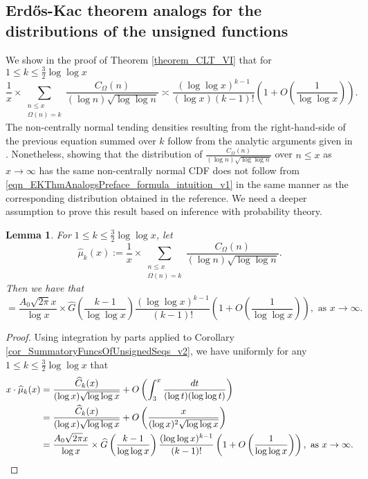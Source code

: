 \documentclass[11pt,reqno,a4letter]{article}
\numberwithin{figure}{section}
\numberwithin{table}{section}
\theoremstyle{plain}
\newtheorem{lemma}[theorem]{Lemma}
\numberwithin{theorem}{section}
\theoremstyle{definition}
\begin{document}
\subsection{Erd\H{o}s-Kac theorem analogs for the distributions of the unsigned functions} 
\label{subSection_ErdosKacTheorem_Analogs} 

We show in the proof of 
Theorem \ref{theorem_CLT_VI} that for 
$1 \leq k \leq \frac{3}{2} \log\log x$ 
\begin{equation}
\label{eqn_EKThmAnalogsPreface_formula_intuition_v1}
     \frac{1}{x} \times \sum_{\substack{n \leq x \\ \Omega(n)=k}} 
     \frac{C_{\Omega}(n)}{(\log n) \sqrt{\log\log n}} \asymp 
     \frac{(\log\log x)^{k-1}}{(\log x) (k-1)!} \left(1 + 
     O\left(\frac{1}{\log\log x}\right)\right). 
\end{equation} 
The non-centrally normal tending densities resulting from the right-hand-side of the 
previous equation summed over $k$ follow from the analytic arguments given in 
\cite[Thm.~7.21; \S 7.4]{MV}. 
Nonetheless, showing that the distribution of 
$\frac{C_{\Omega}(n)}{(\log n) \sqrt{\log\log n}}$ over $n \leq x$ as $x \rightarrow \infty$ 
has the same non-centrally normal CDF does not follow from 
\eqref{eqn_EKThmAnalogsPreface_formula_intuition_v1} in the 
same manner as the corresponding distribution obtained in the reference. 
We need a deeper assumption to prove this result based on inference with 
probability theory. 

\begin{lemma}
For $1 \leq k \leq \frac{3}{2} \log\log x$, let 
\[
\widehat{\mu}_k(x) := \frac{1}{x} \times \sum_{\substack{n \leq x \\ \Omega(n)=k}} 
          \frac{C_{\Omega}(n)}{(\log n) \sqrt{\log\log n}}. 
\] 
Then we have that 
\begin{equation} 
\label{eqn_ProofTag_AnsatzRVDiffFromMeanBound_v0} 
     = \frac{A_0 \sqrt{2\pi} x}{\log x} \times \widehat{G}\left(\frac{k-1}{\log\log x}\right) 
     \frac{(\log\log x)^{k-1}}{(k-1)!}\left(1 + O\left(\frac{1}{\log\log x}\right)\right), 
     \text{ as } x \rightarrow \infty. 
\end{equation}
\end{lemma}
\begin{proof}
Using integration by parts applied to 
Corollary \ref{cor_SummatoryFuncsOfUnsignedSeqs_v2}, we have 
uniformly for any $1 \leq k \leq \frac{3}{2} \log\log x$ that 
\begin{align} 
\notag 
x \cdot \widehat{\mu}_k(x) & = 
     \frac{\widehat{C}_k(x)}{(\log x) \sqrt{\log\log x}} + O\left( 
     \int_3^x \frac{dt}{(\log t) (\log\log t)}\right) \\ 
\notag 
     & = 
     \frac{\widehat{C}_k(x)}{(\log x) \sqrt{\log\log x}} + O\left( 
     \frac{x}{(\log x)^2 \sqrt{\log\log x}}\right) \\ 
\notag 
     & = \frac{A_0 \sqrt{2\pi} x}{\log x} \times \widehat{G}\left(\frac{k-1}{\log\log x}\right) 
     \frac{(\log\log x)^{k-1}}{(k-1)!}\left(1 + O\left(\frac{1}{\log\log x}\right)\right), 
     \text{ as } x \rightarrow \infty. 
\end{align} 
\end{proof}
\end{document}
